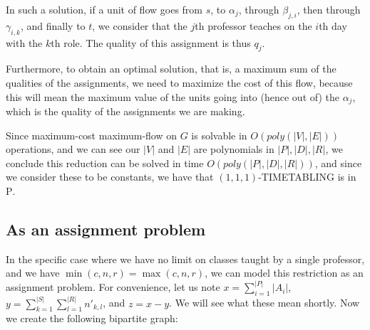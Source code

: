 In such a solution, if a unit of flow goes from $s$, to $\alpha_j$, through $\beta_{j, i}$, then through $\gamma_{i, k}$, and finally to $t$, we consider that the $j$th professor teaches on the $i$th day with the $k$th role. The quality of this assignment is thus $q_j$.

Furthermore, to obtain an optimal solution, that is, a maximum sum of the qualities of the assignments, we need to maximize the cost of this flow, because this will mean the maximum value of the units going into (hence out of) the $\alpha_j$, which is the quality of the assignments we are making.

Since maximum-cost maximum-flow on $G$ is solvable in $O(poly(|V|, |E|))$ operations, and we can see our $|V|$ and $|E|$ are polynomials in $|P|, |D|, |R|$, we conclude this reduction can be solved in time $O(poly(|P|, |D|, |R|))$, and since we consider these to be constants, we have that $(1, 1, 1)$-TIMETABLING is in \textsc{P}.

\subsection{As an assignment problem}

In the specific case where we have no limit on classes taught by a single professor, and we have $\min(c, n, r) = \max(c, n, r)$, we can model this restriction as an assignment problem. For convenience, let us note $x = \sum_{i = 1}^{|P|} |A_i|$, $y = \sum_{k = 1}^{|S|} \sum_{l = 1}^{|R|} n'_{k, l}$, and $z = x - y$. We will see what these mean shortly. Now we create the following bipartite graph:

\begin{center}
\end{center}

